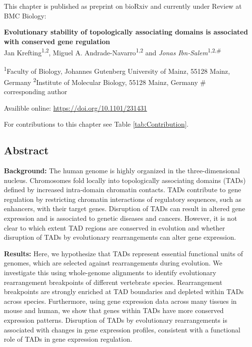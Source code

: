 \documentclass[a4paper,twoside=true,openright,parskip=full,chapterprefix=true,11pt,headings=normal,bibliography=totoc,listof=totoc,titlepage=on,captions=tableabove,draft=false]{scrreprt}
\theoremstyle{definition}
\theoremstyle{definition}
\theoremstyle{definition}
\theoremstyle{remark}
\begin{document}
This chapter is published as preprint on bioRxiv and currently under
Review at BMC Biology:

\textbf{Evolutionary stability of topologically associating domains is
associated with conserved gene regulation}\\
Jan Krefting\textsuperscript{1,2}, Miguel A.
Andrade-Navarro\textsuperscript{1,2} and \emph{Jonas
Ibn-Salem}\textsuperscript{1,2,\#}

\textsuperscript{1}Faculty of Biology, Johannes Gutenberg University of
Mainz, 55128 Mainz, Germany \textsuperscript{2}Institute of Molecular
Biology, 55128 Mainz, Germany \# corresponding author

Availible online: \url{https://doi.org/10.1101/231431}

For contributions to this chapter see Table \ref{tab:Contribution}.

\subsection*{Abstract}\label{abstract-2}

\textbf{Background:} The human genome is highly organized in the
three-dimensional nucleus. Chromosomes fold locally into topologically
associating domains (TADs) defined by increased intra-domain chromatin
contacts. TADs contribute to gene regulation by restricting chromatin
interactions of regulatory sequences, such as enhancers, with their
target genes. Disruption of TADs can result in altered gene expression
and is associated to genetic diseases and cancers. However, it is not
clear to which extent TAD regions are conserved in evolution and whether
disruption of TADs by evolutionary rearrangements can alter gene
expression.

\textbf{Results:} Here, we hypothesize that TADs represent essential
functional units of genomes, which are selected against rearrangements
during evolution. We investigate this using whole-genome alignments to
identify evolutionary rearrangement breakpoints of different vertebrate
species. Rearrangement breakpoints are strongly enriched at TAD
boundaries and depleted within TADs across species. Furthermore, using
gene expression data across many tissues in mouse and human, we show
that genes within TADs have more conserved expression patterns.
Disruption of TADs by evolutionary rearrangements is associated with
changes in gene expression profiles, consistent with a functional role
of TADs in gene expression regulation.
\end{document}
